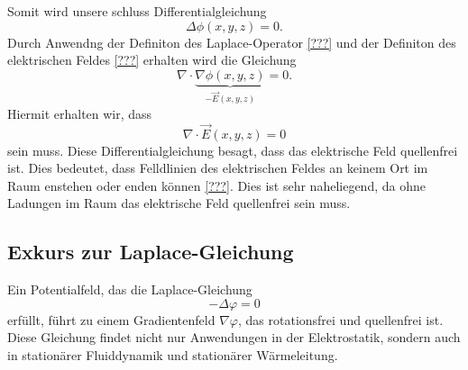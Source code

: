 Somit wird unsere schluss Differentialgleichung
\begin{equation}
	\Delta\phi(x,y,z)
	=
	0.
	\label{maxwell:section:laplace_gleichung_2}
\end{equation}
Durch Anwendng der Definiton des Laplace-Operator \ref{???} und der Definiton des elektrischen Feldes \ref{???} erhalten wird die Gleichung
\[
\nabla\cdot\underbrace{\nabla\phi(x,y,z)}_{-\vec{E}(x,y,z)}
=
0.
\]
Hiermit erhalten wir, dass
\begin{equation}
	\nabla\cdot\vec{E}(x,y,z)
	=
	0
	\label{maxwell:section:e_feld_quellenfrei}
\end{equation}
sein muss. Diese Differentialgleichung besagt, dass das elektrische Feld quellenfrei ist.
Dies bedeutet, dass Felldlinien des elektrischen Feldes an keinem Ort im Raum enstehen oder enden können \ref{???}.
Dies ist sehr naheliegend, da ohne Ladungen im Raum das elektrische Feld quellenfrei sein muss.

\subsection{Exkurs zur Laplace-Gleichung}
\label{maxwell:section:laplacegleichung_exkurs}
Ein Potentialfeld, das die Laplace-Gleichung
\[
-\Delta\varphi
=
0
\]
erfüllt, führt zu einem Gradientenfeld $\nabla\varphi$, das rotationsfrei und quellenfrei ist.
Diese Gleichung findet nicht nur Anwendungen in der Elektrostatik, sondern auch in stationärer Fluiddynamik und stationärer Wärmeleitung.






